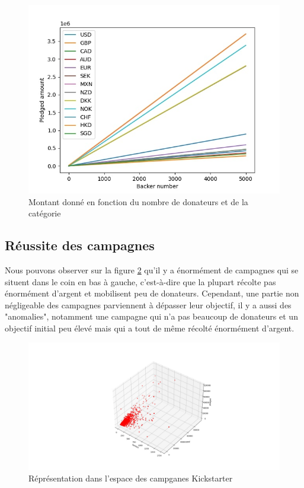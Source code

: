 \documentclass{article}
\begin{document}
\begin{figure}[htbp]
    \graphicspath{{graph/}} 
    \centerline{\includegraphics[scale=0.5]{currency_comparison.jpg}}
    \caption{Montant donné en fonction du nombre de donateurs et de la catégorie}
    \label{fig_devise}
\end{figure}

\newpage

\subsection{Réussite des campagnes}
\label{reussite}
\tabto{1cm} Nous pouvons observer sur la figure \ref{fig_reussite} qu'il y a énormément de campagnes qui se situent dans le coin en bas à gauche, c'est-à-dire que la plupart récolte pas énormément d'argent et mobilisent peu de donateurs.
Cependant, une partie non négligeable des campagnes parviennent à dépasser leur objectif, il y a aussi des "anomalies", notamment une campagne qui n'a pas beaucoup de donateurs et un objectif initial peu élevé mais qui a tout de même récolté énormément d'argent.

\begin{figure}[htbp]
    \graphicspath{{graph/}} 
    \centerline{\includegraphics[scale=0.4]{goal_pledged_backers.jpg}}
    \caption{Réprésentation dans l'espace des campganes Kickstarter}
    \label{fig_reussite}
\end{figure}
\\
\\
\end{document}
